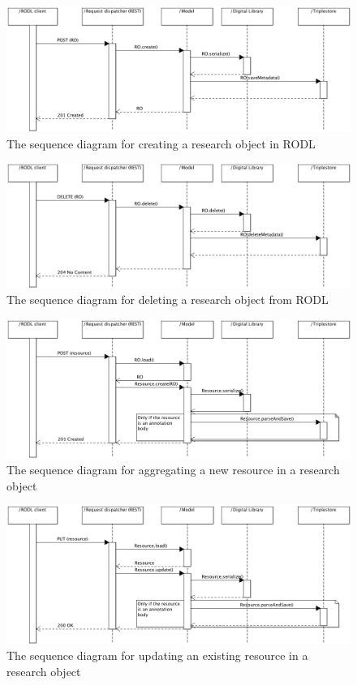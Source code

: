 \begin{figure}[!hb]
\centering
\includegraphics[width=\textwidth]{Figures/RODL/ROcreate.png}
\caption{The sequence diagram for creating a research object in RODL}
\label{ROCreate}
\end{figure}

\begin{figure}[!hb]
\centering
\includegraphics[width=\textwidth]{Figures/RODL/ROdelete.png}
\caption{The sequence diagram for deleting a research object from RODL}
\label{RODelete}
\end{figure}

\begin{figure}[!hb]
\centering
\includegraphics[width=\textwidth]{Figures/RODL/ResourceAdd.png}
\caption{The sequence diagram for aggregating a new resource in a research object}
\label{ResourceAdd}
\end{figure}

\begin{figure}[!hb]
\centering
\includegraphics[width=\textwidth]{Figures/RODL/ResourceUpdate.png}
\caption{The sequence diagram for updating an existing resource in a research object}
\label{ResourceUpdate}
\end{figure}

